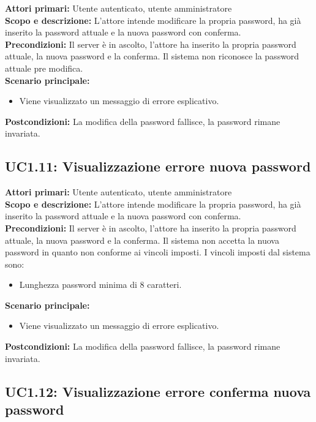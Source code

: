\documentclass{scalatekids-article}
\begin{document}
\textbf{Attori primari:} Utente autenticato, utente amministratore\\
\textbf{Scopo e descrizione:} L'attore intende modificare la propria password, ha già inserito la password attuale e la nuova password con conferma.\\
\textbf{Precondizioni:} Il server è in ascolto, l'attore ha inserito la propria password attuale, la nuova password e la conferma. Il sistema non riconosce la password attuale pre modifica.\\
\textbf{Scenario principale:}
\begin{itemize}
\item Viene visualizzato un messaggio di errore esplicativo.
\end{itemize}
\textbf{Postcondizioni:} La modifica della password fallisce, la password rimane invariata.

\subsection{UC1.11: Visualizzazione errore nuova password}

\textbf{Attori primari:} Utente autenticato, utente amministratore\\
\textbf{Scopo e descrizione:} L'attore intende modificare la propria password, ha già inserito la password attuale e la nuova password con conferma.\\
\textbf{Precondizioni:} Il server è in ascolto, l'attore ha inserito la propria password attuale, la nuova password e la conferma. Il sistema non accetta la nuova password in quanto non conforme ai
vincoli imposti. I vincoli imposti dal sistema sono:
\begin{itemize}
\item Lunghezza password minima di 8 caratteri.
\end{itemize}
\textbf{Scenario principale:}
\begin{itemize}
\item Viene visualizzato un messaggio di errore esplicativo.
\end{itemize}
\textbf{Postcondizioni:} La modifica della password fallisce, la password rimane invariata.

\subsection{UC1.12: Visualizzazione errore conferma nuova password}
\end{document}
